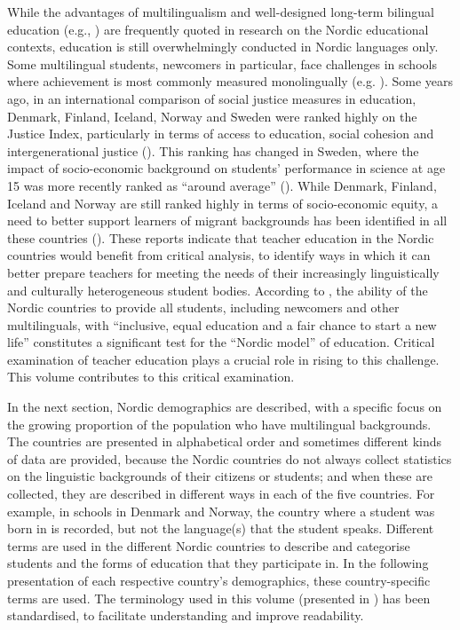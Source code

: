 \documentclass[output=paper]{langscibook}
\begin{document}
While the advantages of multilingualism and well-designed long-term bilingual education (e.g., \citealt{ThomasCollier2002}) are frequently quoted in research on the Nordic educational contexts, education is still overwhelmingly conducted in Nordic languages only. Some multilingual students, newcomers in particular, face challenges in schools where achievement is most commonly measured monolingually (e.g. \citealt{Cummins2000}). Some years ago, in an international comparison of social justice measures in education, Denmark, Finland, Iceland, Norway and Sweden were ranked highly on the Justice Index, particularly in terms of access to education, social cohesion and intergenerational justice (\citealt{Schraad-Tischler2011}). This ranking has changed in Sweden, where the impact of socio-economic background on students’ performance in science at age 15 was more recently ranked as “around average” (\citealt{OECD2017}). While Denmark, Finland, Iceland and Norway are still ranked highly in terms of socio-economic equity, a need to better support learners of migrant backgrounds has been identified in all these countries (\citealt{OECD2016, OECD2020, OECD2020-1, OECD2020-2}). These reports indicate that teacher education in the Nordic countries would benefit from critical analysis, to identify ways in which it can better prepare teachers for meeting the needs of their increasingly linguistically and culturally heterogeneous student bodies. According to \citet[10]{Lundahl2016}, the ability of the Nordic countries to provide all students, including newcomers and other multilinguals, with “inclusive, equal education and a fair chance to start a new life” constitutes a significant test for the “Nordic model” of education. Critical examination of teacher education plays a crucial role in rising to this challenge. This volume contributes to this critical examination.

In the next section, Nordic demographics are described, with a specific focus on the growing proportion of the population who have multilingual backgrounds. The countries are presented in alphabetical order and sometimes different kinds of data are provided, because the Nordic countries do not always collect statistics on the linguistic backgrounds of their citizens or students; and when these are collected, they are described in different ways in each of the five countries. For example, in schools in Denmark and Norway, the country where a student was born in is recorded, but not the language(s) that the student speaks. Different terms are used in the different Nordic countries to describe and categorise students and the forms of education that they participate in. In the following presentation of each respective country’s demographics, these country-specific terms are used. The terminology used in this volume (presented in ) has been standardised, to facilitate understanding and improve readability. 
\end{document}

